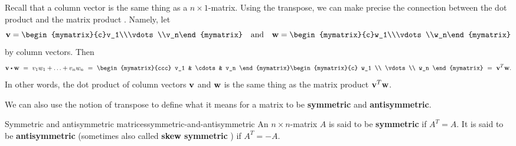Recall that a column vector is the same thing as a $n\times
1$-matrix. Using the transpose, we can make precise the connection
between the dot product and the matrix product%
%
. Namely, let
\begin{equation*}
  \vect{v}=\begin{mymatrix}{c}v_1\\\vdots\\v_n\end{mymatrix}
  \quad\mbox{and}\quad
  \vect{w}=\begin{mymatrix}{c}w_1\\\vdots\\w_n\end{mymatrix}
\end{equation*}
by column vectors. Then
\begin{equation*}
  \vect{v}\dotprod\vect{w}
  ~=~
  v_1w_1 + \ldots + v_nw_n
  ~=~
  \begin{mymatrix}{ccc} v_1 & \cdots & v_n \end{mymatrix}
  \begin{mymatrix}{c} w_1 \\ \vdots \\ w_n \end{mymatrix}
  ~=~
  \vect{v}^T\vect{w}.
\end{equation*}
In other words, the dot product of column vectors $\vect{v}$ and
$\vect{w}$ is the same thing as the matrix product
$\vect{v}^T\vect{w}$.

We can also use the notion of transpose to define what it means for a
matrix to be \textbf{symmetric} and \textbf{antisymmetric}.

\begin{definition}{Symmetric and antisymmetric matrices}{symmetric-and-antisymmetric}
  An $n\times n$-matrix $A$ is said to be \textbf{symmetric}%
   if $A^T=A$. It is
  said to be \textbf{antisymmetric}%
   (sometimes
  also called \textbf{skew symmetric}%
  ) if
  $A^T=-A$.
\end{definition}

